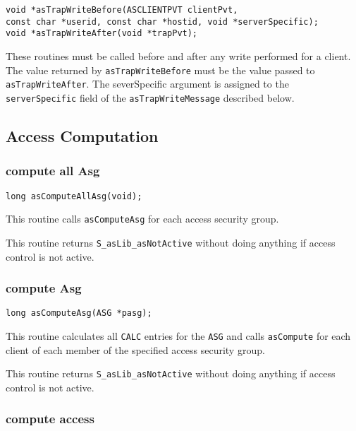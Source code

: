 \begin{verbatim}
void *asTrapWriteBefore(ASCLIENTPVT clientPvt,
const char *userid, const char *hostid, void *serverSpecific);
void *asTrapWriteAfter(void *trapPvt);
\end{verbatim}

These routines must be called before and after any write performed for a client. The value returned by 
\verb|asTrapWriteBefore| must be the value passed to \verb|asTrapWriteAfter|. The severSpecific argument is assigned to 
the \verb|serverSpecific| field of the \verb|asTrapWriteMessage| described below. 

\subsection{Access Computation}

\subsubsection{compute all Asg}

\begin{verbatim}
long asComputeAllAsg(void); 
\end{verbatim}

This routine calls \verb|asComputeAsg| for each access security group.

This routine returns \verb|S_asLib_asNotActive| without doing anything if access control is not active.

\subsubsection{compute Asg}

\begin{verbatim}
long asComputeAsg(ASG *pasg); 
\end{verbatim}

This routine calculates all \verb|CALC| entries for the \verb|ASG| and calls \verb|asCompute| for each client of each member of the specified 
access security group.

This routine returns \verb|S_asLib_asNotActive| without doing anything if access control is not active.

\subsubsection{compute access}

